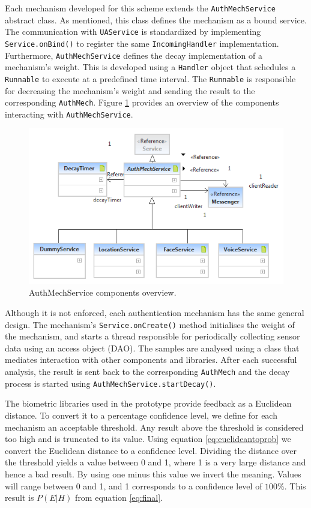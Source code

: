 Each mechanism developed for this scheme extends the {\tt AuthMechService} abstract class. As mentioned, this class defines the mechanism as a bound service. The communication with {\tt UAService} is standardized by implementing {\tt Service.onBind()} to register the same {\tt IncomingHandler} implementation. Furthermore, {\tt AuthMechService} defines the decay implementation of a mechanism's weight. This is developed using a {\tt Handler} object that schedules a {\tt Runnable} to execute at a predefined time interval. The {\tt Runnable} is responsible for decreasing the mechanism's weight and sending the result to the corresponding {\tt AuthMech}. Figure \ref{fig:authmechservice} provides an overview of the components interacting with {\tt AuthMechService}.
\begin{figure}[h]
    \centering
    \includegraphics[width=\textwidth]{Pictures/authmechservice-brief}
    \caption{AuthMechService components overview.}
    \label{fig:authmechservice}
\end{figure}

Although it is not enforced, each authentication mechanism has the same general design. The mechanism's {\tt Service.onCreate()} method initialises the weight of the mechanism, and starts a thread responsible for periodically collecting sensor data using an access object (DAO). The samples are analysed using a class that mediates interaction with other components and libraries. After each successful analysis, the result is sent back to the corresponding {\tt AuthMech} and the decay process is started using {\tt AuthMechService.startDecay()}.

The biometric libraries used in the prototype provide feedback as a Euclidean distance. To convert it to a percentage confidence level, we define for each mechanism an acceptable threshold. Any result above the threshold is considered too high and is truncated to its value. Using equation \ref{eq:euclideantoprob} we convert the Euclidean distance to a confidence level. Dividing the distance over the threshold yields a value between 0 and 1, where 1 is a very large distance and hence a bad result. By using one minus this value we invert the meaning. Values will range between 0 and 1, and 1 corresponds to a confidence level of $100\%$. This result is $P(E|H)$ from equation \ref{eq:final}.

